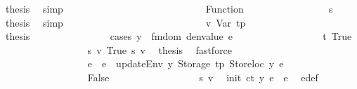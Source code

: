 \begin{isabellebody}
\ {\isacharquery}{\kern0pt}thesis\ \isamarkupfalse%
\ simp\isanewline
\ \ \ \ \ \ \ \ \ \ \ \ \isamarkupfalse%
\isanewline
\ \ \ \ \ \ \ \ \ \ \ \ \ \ \isamarkupfalse%
\ {\isacharparenleft}{\kern0pt}Function\ {\isacharunderscore}{\kern0pt}{\isacharparenright}{\kern0pt}\isanewline
\ \ \ \ \ \ \ \ \ \ \ \ \ \ \isamarkupfalse%
\ s{}\ \isamarkupfalse%
\ {\isacharquery}{\kern0pt}thesis\ \isamarkupfalse%
\ simp\isanewline
\ \ \ \ \ \ \ \ \ \ \ \ \isamarkupfalse%
\isanewline
\ \ \ \ \ \ \ \ \ \ \ \ \ \ \isamarkupfalse%
\ v{}{\isacharcolon}{\kern0pt}\ {\isacharparenleft}{\kern0pt}Var\ tp{\isacharprime}{\kern0pt}{\isacharparenright}{\kern0pt}\isanewline
\ \ \ \ \ \ \ \ \ \ \ \ \ \ \isamarkupfalse%
\ \isamarkupfalse%
\ {\isacharquery}{\kern0pt}thesis\isanewline
\ \ \ \ \ \ \ \ \ \ \ \ \ \ \isamarkupfalse%
\ {\isacharparenleft}{\kern0pt}cases\ {\isachardoublequoteopen}y\ {\isacharbar}{\kern0pt}{\isasymin}{\isacharbar}{\kern0pt}\ fmdom\ {\isacharparenleft}{\kern0pt}denvalue\ e{\isacharparenright}{\kern0pt}{\isachardoublequoteclose}{\isacharparenright}{\kern0pt}\isanewline
\ \ \ \ \ \ \ \ \ \ \ \ \ \ \ \ \isamarkupfalse%
\ t{}{\isacharcolon}{\kern0pt}\ True\isanewline
\ \ \ \ \ \ \ \ \ \ \ \ \ \ \ \ \isamarkupfalse%
\ s{}\ v{}\ True\ s{}\ v{}\ \isamarkupfalse%
\ {\isacharquery}{\kern0pt}thesis\ \isamarkupfalse%
\ fastforce\isanewline
\ \ \ \ \ \ \ \ \ \ \ \ \ \ \isamarkupfalse%
\isanewline
\ \ \ \ \ \ \ \ \ \ \ \ \ \ \ \ \isamarkupfalse%
\ e{\isacharprime}{\kern0pt}\ \ {\isachardoublequoteopen}e{\isacharprime}{\kern0pt}\ {\isacharequal}{\kern0pt}\ updateEnv\ y\ {\isacharparenleft}{\kern0pt}Storage\ tp{\isacharprime}{\kern0pt}{\isacharparenright}{\kern0pt}\ {\isacharparenleft}{\kern0pt}Storeloc\ y{\isacharparenright}{\kern0pt}\ e{\isachardoublequoteclose}\isanewline
\ \ \ \ \ \ \ \ \ \ \ \ \ \ \ \ \isamarkupfalse%
\ False\isanewline
\ \ \ \ \ \ \ \ \ \ \ \ \ \ \ \ \isamarkupfalse%
\ s{}\ v{}\ \isamarkupfalse%
\ {\isachardoublequoteopen}init\ ct\ y\ e\ {\isacharequal}{\kern0pt}\ e{\isacharprime}{\kern0pt}{\isachardoublequoteclose}\ \isamarkupfalse%
\ e{\isacharprime}{\kern0pt}{\isacharunderscore}{\kern0pt}def\ \isamarkupfalse%

\end{isabellebody}
